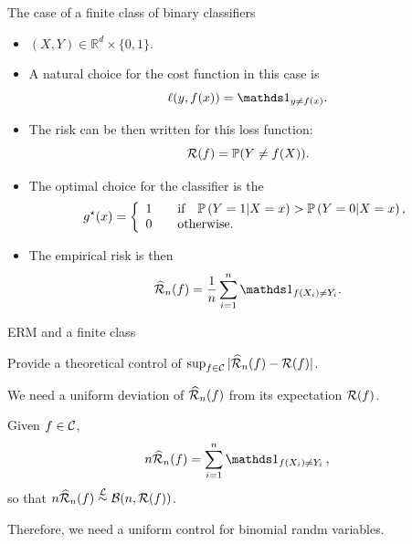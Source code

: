\documentclass[xcolor={usenames,dvipsnames},handout]{beamer}
\begin{document}
\begin{frame}{The case of a finite class of binary classifiers}

\begin{itemize}
\item $(X,Y)\in \mathbb{R}^d\times\{0,1\}$.
\item A natural choice for the cost function in this case is
$$
\ell(y,f(x)) = \one_{y\neq f(x)}.
$$
\item  The risk can be then written for this loss function:
\pause
$$
{\mathcal{R}}(f) = \mathbb{P}(Y\neq f(X)).
$$
\item The optimal choice for the classifier is the 
\pause
$$
g^{\star}(x) =
\left\{
	\begin{array}{cc}
		1 &\quad \text{if} \quad \P \left( Y=1 | X=x \right) > \P \left( Y=0 | X=x \right), \\
		0 &\quad \text{otherwise}. \hfill
	\end{array}
\right.
$$
\item The empirical risk is then
$$
\widehat{\Rc}_n(f) = \frac{1}{n} \sum_{i=1}^n \one_{f(X_i) \neq Y_i}.
$$
\end{itemize}
\end{frame}




\begin{frame}{ERM and a finite class}

  Provide a theoretical control of $\sup_{f\in \mathcal{C}} | \widehat{{\mathcal{R}}}_n(f) - {\mathcal{R}}(f) |$.

\vspace{.4cm}

We need a \alert{uniform deviation of $\widehat{{\mathcal{R}}}_n(f)$ from its expectation ${\mathcal{R}}(f)$}.

\vspace{.4cm}

Given $f\in \mathcal{C}$, 
$$
n \widehat{\Rc}_n(f) =  \sum_{i=1}^n \one_{f(X_i) \neq Y_i}\,,
$$
so that \alert{$n \widehat{{\mathcal{R}}}_n(f) \overset{{\mathcal{L}}}{\sim} {\mathcal{B}} (n, {\mathcal{R}}(f) )$}.

\vspace{.4cm}

Therefore, we need  a uniform control for binomial randm variables.
\end{frame}
\end{document}
